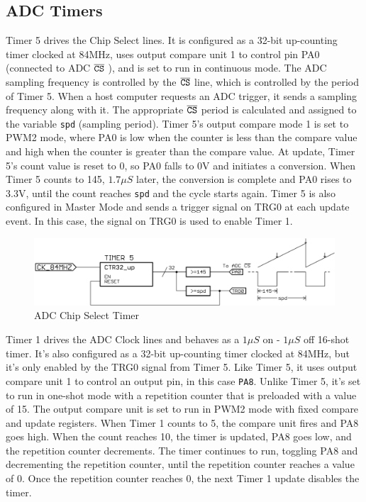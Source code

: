 \documentclass[11pt,twoside]{mitthesis}
\begin{document}
\subsection{ADC Timers}

Timer 5 drives the Chip Select lines.
It is configured as a 32-bit up-counting timer clocked at 84MHz, uses output compare unit 1 to control pin PA0 (connected to ADC $\overline{\mbox{\texttt{CS}}}$ ), and is set to run in continuous mode.
The ADC sampling frequency is controlled by the $\overline{\mbox{\texttt{CS}}}$ line, which is controlled by the period of Timer 5.
When a host computer requests an ADC trigger, it sends a sampling frequency along with it.
The appropriate $\overline{\mbox{\texttt{CS}}}$ period is calculated and assigned to the variable \texttt{spd} (sampling period).
Timer 5's output compare mode 1 is set to PWM2 mode, where PA0 is low when the counter is less than the compare value and high when the counter is greater than the compare value.
At update, Timer 5's count value is reset to 0, so PA0 falls to 0V and initiates a conversion.
When Timer 5 counts to 145, $1.7\mu S$ later, the conversion is complete and PA0 rises to 3.3V, until the count reaches \texttt{spd} and the cycle starts again.
Timer 5 is also configured in Master Mode and sends a trigger signal on TRG0 at each update event.
In this case, the signal on TRG0 is used to enable Timer 1.

\begin{figure}[H]
  \begin{center}
      \includegraphics[width=1\textwidth]{../tim5.png}
      \caption{ADC Chip Select Timer}
  \end{center}
\end{figure}

Timer 1 drives the ADC Clock lines and behaves as a $1\mu S$ on - $1\mu S$ off 16-shot timer.
It's also configured as a 32-bit up-counting timer clocked at 84MHz, but it's only enabled by the TRG0 signal from Timer 5.
Like Timer 5, it uses output compare unit 1 to control an output pin, in this case \texttt{PA8}.
Unlike Timer 5, it's set to run in one-shot mode with a repetition counter that is preloaded with a value of 15.
The output compare unit is set to run in PWM2 mode with fixed compare and update registers.
When Timer 1 counts to 5, the compare unit fires and PA8 goes high.
When the count reaches 10, the timer is updated, PA8 goes low, and the repetition counter decrements.
The timer continues to run, toggling PA8 and decrementing the repetition counter, until the repetition counter reaches a value of 0.
Once the repetition counter reaches 0, the next Timer 1 update disables the timer.
\end{document}
